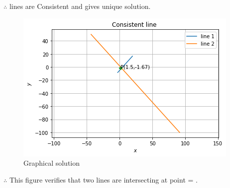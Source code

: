 \documentclass[journal,12pt,twocolumn]{IEEEtran}
\begin{document}
   $\therefore$ lines are Consistent and gives unique solution.
\begin{figure}[H]
    \includegraphics[width= \columnwidth]{consistent line.png}
    \caption{Graphical solution}
    \label{Fig:Graphical Solution}
\end{figure}
   $\therefore$ This figure verifies that two lines are intersecting at point  = .
\end{document}
